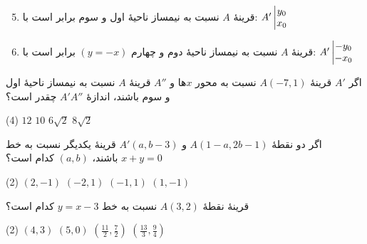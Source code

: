 \begin{remark}[توجه]
    \begin{enumerate}[label=\arabic*, leftmargin=*]
        \setcounter{enumi}{4}
        \setlength{\itemsep}{0.25\baselineskip}

        \item قرینۀ \(A\) نسبت به نیمساز ناحیۀ اول و سوم برابر است با:
        $A'\left|\begin{matrix}y_0\\x_0\end{matrix}\right.$

        \item قرینۀ \(A\) نسبت به نیمساز ناحیۀ دوم و چهارم
        \((y=-x)\) برابر است با:
        $A'\left|\begin{matrix}-y_0\\-x_0\end{matrix}\right.$
    \end{enumerate}
\end{remark}



\begin{example}
    اگر \(A'\) قرینۀ \(A(-7,1)\) نسبت به محور \(x\)ها و
    \(A''\) قرینۀ \(A\) نسبت به نیمساز ناحیۀ اول و سوم باشند،
    اندازۀ \(A'A''\) چقدر است؟

    \begin{tasks}(4)
        \task \(12\)
        \task \(10\)
        \task \(6\sqrt{2}\)
        \task \(8\sqrt{2}\)
    \end{tasks}
\end{example}

\begin{example}
    اگر دو نقطۀ \(A(1-a,2b-1)\) و \(A'(a,b-3)\)
    قرینۀ یکدیگر نسبت به خط \(x+y=0\) باشند،
    \((a,b)\) کدام است؟

    \begin{tasks}(2)
        \task \((2,-1)\)
        \task \((-2,1)\)
        \task \((-1,1)\)
        \task \((1,-1)\)
    \end{tasks}
\end{example}

\begin{example}
    قرینۀ نقطۀ \(A(3,2)\) نسبت به خط \(y=x-3\) کدام است؟

    \begin{tasks}(2)
        \task \((4,3)\)
        \task \((5,0)\)
        \task \(\left(\frac{11}{2},\frac{7}{2}\right)\)
        \task \(\left(\frac{13}{3},\frac{9}{4}\right)\)
    \end{tasks}
\end{example}



